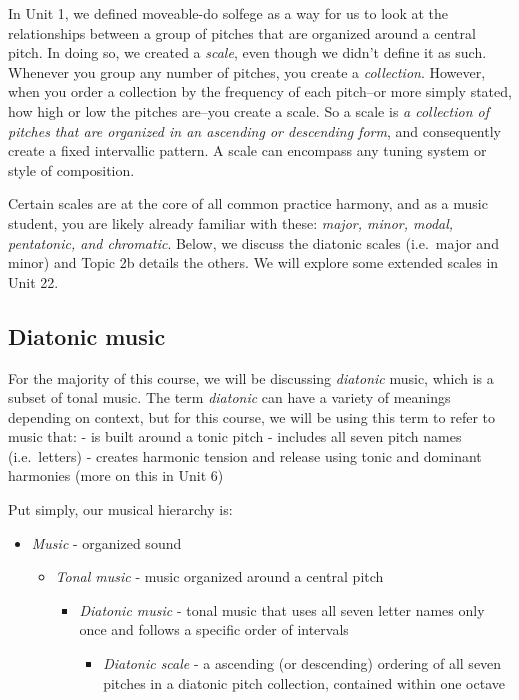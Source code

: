 \documentclass{book}
\providecommand{\tightlist}{%
  \setlength{\itemsep}{0pt}\setlength{\parskip}{0pt}}
\begin{document}
In Unit 1, we defined moveable-do solfege as a way for us to look at the
relationships between a group of pitches that are organized around a central
pitch. In doing so, we created a \emph{scale}, even though we didn't define it
as such. Whenever you group any number of pitches, you create a
\emph{collection}. However, when you order a collection by the frequency of
each pitch--or more simply stated, how high or low the pitches are--you create
a scale. So a scale is \emph{a collection of pitches that are organized in an
ascending or descending form}, and consequently create a fixed intervallic
pattern. A scale can encompass any tuning system or style of composition.

Certain scales are at the core of all common practice harmony, and as a music
student, you are likely already familiar with these: \emph{major, minor,
modal, pentatonic, and chromatic}. Below, we discuss the diatonic scales
(i.e.~major and minor) and Topic 2b details the others. We will explore some
extended scales in Unit 22.

\hypertarget{diatonic-music}{%
\subsection{Diatonic music}\label{diatonic-music}}

For the majority of this course, we will be discussing \emph{diatonic} music,
which is a subset of tonal music. The term \emph{diatonic} can have a variety
of meanings depending on context, but for this course, we will be using this
term to refer to music that: - is built around a tonic pitch - includes all
seven pitch names (i.e.~letters) - creates harmonic tension and release using
tonic and dominant harmonies (more on this in Unit 6)

Put simply, our musical hierarchy is:

\begin{itemize}
\tightlist
\item
  \emph{Music} - organized sound

  \begin{itemize}
  \tightlist
  \item
    \emph{Tonal music} - music organized around a central pitch

    \begin{itemize}
    \tightlist
    \item
      \emph{Diatonic music} - tonal music that uses all seven letter names
      only once and follows a specific order of intervals

      \begin{itemize}
      \tightlist
      \item
        \emph{Diatonic scale} - a ascending (or descending) ordering of all
        seven pitches in a diatonic pitch collection, contained within one
        octave
      \end{itemize}
    \end{itemize}
  \end{itemize}
\end{itemize}
\end{document}
